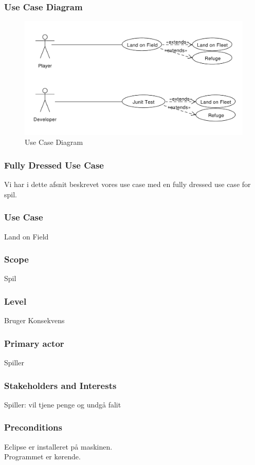 \subsubsection{Use Case Diagram}
\begin{figure}[ht]
\centering
\includegraphics[width=1\textwidth]{UseCase.pdf}
\caption[<Text for the list of figures>]{Use Case Diagram}
\label{fig:figure 2}
\end{figure}
\newpage
\subsubsection{Fully Dressed Use Case}
Vi har i dette afsnit beskrevet vores use case med en fully dressed use case for spil.
\subsubsection*{Use Case}
Land on Field
\subsubsection*{Scope}
Spil
\subsubsection*{Level}
Bruger Konsekvens
\subsubsection*{Primary actor}
Spiller
\subsubsection*{Stakeholders and Interests}
Spiller: vil tjene penge og undgå falit
\subsubsection*{Preconditions}
Eclipse er installeret på maskinen.
\\
Programmet er kørende.
